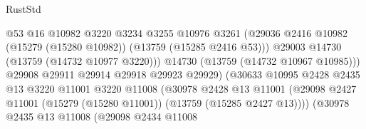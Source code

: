 \begin{lexlean}{RustStd}
\begin{coremodule}
                                              @53
                                              @16
                                              @10982
                                              @3220
                                              @3234
                                              @3255
                                              @10976
                                              @3261
                                              (@29036
                                                @2416
                                                @10982
                                                (@15279 (@15280 @10982))
                                                (@13759 (@15285 @2416 @53)))
                                              @29003
                                              @14730
                                              (@13759 (@14732 @10977 @3220)))
                                            @14730
                                            (@13759 (@14732 @10967 @10985)))
                                          @29908
                                          @29911
                                          @29914
                                          @29918
                                          @29923
                                          @29929)
                                        (@30633
                                          @10995
                                          @2428
                                          @2435
                                          @13
                                          @3220
                                          @11001
                                          @3220
                                          @11008
                                          (@30978
                                            @2428
                                            @13
                                            @11001
                                            (@29098
                                              @2427
                                              @11001
                                              (@15279 (@15280 @11001))
                                              (@13759 (@15285 @2427 @13))))
                                          (@30978
                                            @2435
                                            @13
                                            @11008
                                            (@29098
                                              @2434
                                              @11008

\end{coremodule}
\end{lexlean}
